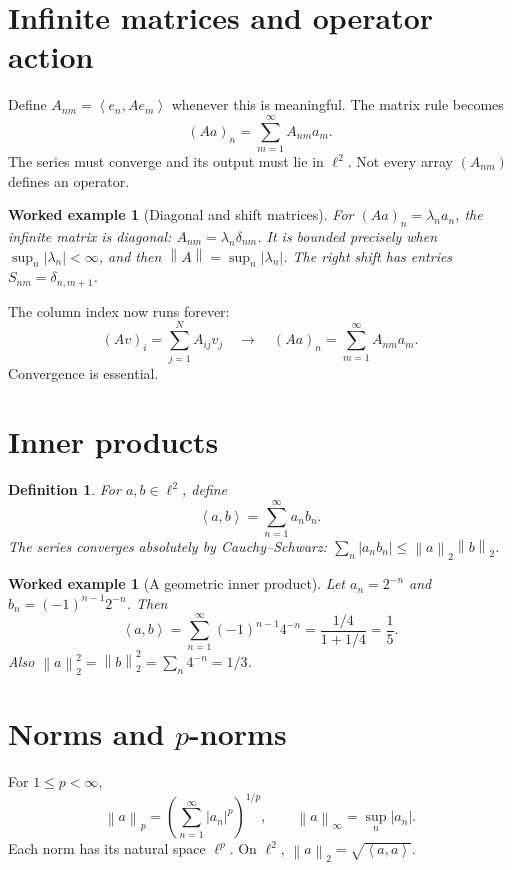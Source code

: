 \documentclass[11pt,a5paper,oneside,openany]{scrreprt}
\theoremstyle{notes}
\theoremstyle{definitions}
\newtheorem{definition}[theorem]{Definition}
\newtheorem{example}[theorem]{Worked example}
\newcommand{\ip}[2]{\left\langle #1,#2\right\rangle}
\newcommand{\norm}[1]{\left\lVert #1\right\rVert}
\begin{document}
\section{Infinite matrices and operator action}

Define $A_{nm}=\ip{e_n}{Ae_m}$ whenever this is meaningful.  The matrix rule
becomes
\[
  \boxed{(Aa)_n=\sum_{m=1}^{\infty}A_{nm}a_m}.
\]
The series must converge and its output must lie in $\ell^2$.  Not every array
$(A_{nm})$ defines an operator.

\begin{example}[Diagonal and shift matrices]
For $(Aa)_n=\lambda_na_n$, the infinite matrix is diagonal:
$A_{nm}=\lambda_n\delta_{nm}$.  It is bounded precisely when
$\sup_n|\lambda_n|<\infty$, and then $\norm{A}=\sup_n|\lambda_n|$.
The right shift has entries $S_{nm}=\delta_{n,m+1}$.
\end{example}

\begin{bridge}
The column index now runs forever:
\[
  (Av)_i=\sum_{j=1}^{N}A_{ij}v_j
  \quad\longrightarrow\quad
  (Aa)_n=\sum_{m=1}^{\infty}A_{nm}a_m.
\]
Convergence is essential.
\end{bridge}

\section{Inner products}

\begin{definition}
For $a,b\in\ell^2$, define
\[
  \boxed{\ip{a}{b}=\sum_{n=1}^{\infty}a_nb_n}.
\]
The series converges absolutely by Cauchy--Schwarz:
$\sum_n|a_nb_n|\le\norm{a}_2\norm{b}_2$.
\end{definition}

\begin{example}[A geometric inner product]
Let $a_n=2^{-n}$ and $b_n=(-1)^{n-1}2^{-n}$.  Then
\[
 \ip{a}{b}=\sum_{n=1}^{\infty}(-1)^{n-1}4^{-n}
 =\frac{1/4}{1+1/4}=\frac15.
\]
Also $\norm{a}_2^2=\norm{b}_2^2=\sum_n4^{-n}=1/3$.
\end{example}

\section{Norms and $p$-norms}

For $1\le p<\infty$,
\[
 \norm{a}_p=\left(\sum_{n=1}^{\infty}|a_n|^p\right)^{1/p},
 \qquad
 \norm{a}_\infty=\sup_n|a_n|.
\]
Each norm has its natural space $\ell^p$.  On $\ell^2$,
$\norm{a}_2=\sqrt{\ip{a}{a}}$.
\end{document}
